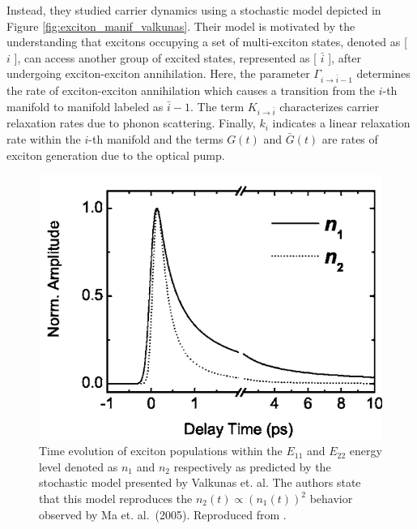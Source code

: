 Instead, they studied carrier dynamics using a stochastic model depicted in Figure \ref{fig:exciton_manif_valkunas}. Their model is motivated by the understanding that excitons occupying a set of multi-exciton states, denoted as [ $i$ ], can access another group of excited states, represented as [ $\displaystyle\bar{i}$ ], after undergoing exciton-exciton annihilation. Here, the parameter $\Gamma_{i \rightarrow \bar{i}-1}$ determines the rate of exciton-exciton annihilation which causes a transition from the $i$-th manifold to manifold labeled as $\bar{i} - 1$. The term $K_{i \rightarrow \bar{i}}$ characterizes carrier relaxation rates due to phonon scattering. Finally, $k_i$ indicates a linear relaxation rate within the $i$-th manifold and the terms $G(t)$ and $\bar{G}(t)$ are rates of exciton generation due to the optical pump.


\begin{figure}[ht]
	\centering
	\includegraphics[scale=0.4]{images/chapter_prior_works/e11_e22_population_valkunas_2006}
	\caption{Time evolution of exciton populations within the $E_{11}$ and $E_{22}$ energy level denoted as $n_1$ and $n_2$ respectively as predicted by the stochastic model presented by Valkunas et. al. The authors state that this model reproduces the $n_2(t) \propto (n_1(t))^2$ behavior observed by Ma et. al.\ (2005). Reproduced from \cite{valkunas2006exciton}. }
	\label{fig:e11_e22_pop_valkunas}
\end{figure}

